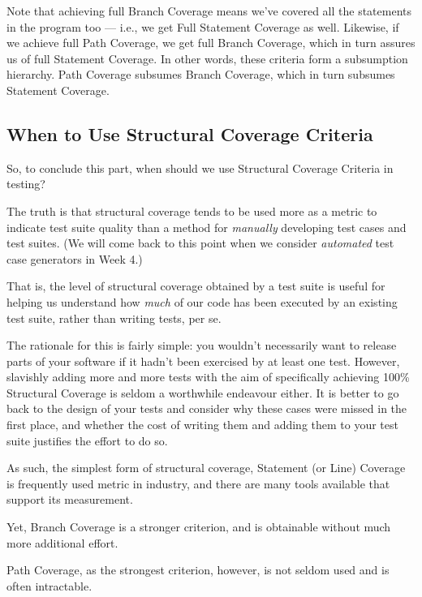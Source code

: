 
Note that achieving full Branch Coverage means we've covered all the statements
in the program too --- i.e., we get Full Statement Coverage as well. Likewise,
if we achieve full Path Coverage, we get full Branch Coverage, which in turn
assures us of full Statement Coverage. In other words, these criteria form a
subsumption hierarchy. Path Coverage subsumes Branch Coverage, which in turn
subsumes Statement Coverage.


\subsection{When to Use Structural Coverage Criteria} 

So, to conclude this part, when should we use Structural Coverage Criteria in
testing?


The truth is that structural coverage tends to be used more as a metric to
indicate test suite quality than a method for {\it manually} developing test
cases and test suites. (We will come back to this point when we consider {\it
automated} test case generators in Week 4.)

That is, the level of structural coverage obtained by a test suite is useful for
helping us understand how {\it much} of our code has been executed by an
existing test suite, rather than writing tests, per se.


The rationale for this is fairly simple: you wouldn't necessarily want to
release parts of your software if it hadn't been exercised by at least one test.
However, slavishly adding more and more tests with the aim of specifically
achieving 100\% Structural Coverage is seldom a worthwhile endeavour either. It
is better to go back to the design of your tests and consider why these cases
were missed in the first place, and whether the cost of writing them and adding
them to your test suite justifies the effort to do so.


As such, the simplest form of structural coverage, Statement (or Line) Coverage
is frequently used metric in industry, and there are many tools available that
support its measurement. 


Yet, Branch Coverage is a stronger criterion, and is obtainable without much
more additional effort. 


Path Coverage, as the strongest criterion, however, is not seldom used and is
often intractable.

